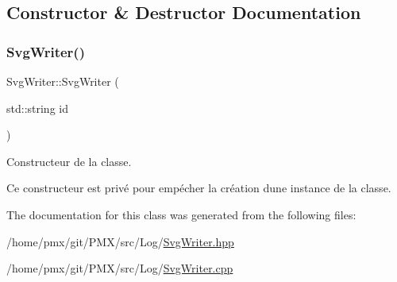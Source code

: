 \subsection{Constructor \& Destructor Documentation}
\mbox{\label{classSvgWriter_a30059a7d7289c57d3bf1bf623713dc0a}} 
\subsubsection{\texorpdfstring{Svg\+Writer()}{SvgWriter()}}
{\footnotesize\ttfamily Svg\+Writer\+::\+Svg\+Writer (\begin{DoxyParamCaption}\item[{std\+::string}]{id }\end{DoxyParamCaption})}



Constructeur de la classe. 

Ce constructeur est privé pour empécher la création d\textquotesingle{}une instance de la classe. 

The documentation for this class was generated from the following files\+:\begin{DoxyCompactItemize}
\item 
/home/pmx/git/\+P\+M\+X/src/\+Log/\hyperlink{SvgWriter_8hpp}{Svg\+Writer.\+hpp}\item 
/home/pmx/git/\+P\+M\+X/src/\+Log/\hyperlink{SvgWriter_8cpp}{Svg\+Writer.\+cpp}\end{DoxyCompactItemize}
